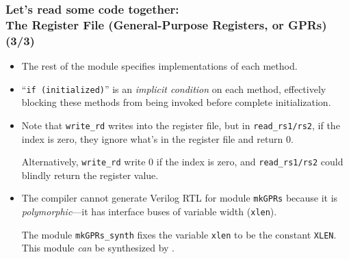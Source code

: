 \begin{frame}[fragile]
\frametitle{Let's read some code together: \\
            The Register File (General-Purpose Registers, or GPRs) (3/3)}

\begin{center}\scriptsize


 \vspace{1ex}

 \begin{minipage}{0.8\textwidth}
  \begin{itemize}

   \item The rest of the module specifies implementations of each method.

   \vspace*{1ex}

   \item ``{\tt if (initialized)}'' is an \emph{implicit condition} on
       each method, effectively blocking these methods from being
       invoked before complete initialization.

   \item Note that {\tt write\_rd} writes into the register file, but
       in {\tt read\_rs1/rs2}, if the index is zero, they ignore
       what's in the register file and return 0.

       \vspace*{1ex}

       Alternatively, {\tt write\_rd} write 0 if the index is zero,
       and {\tt read\_rs1/rs2} could blindly return the register
       value.

   \vspace*{2ex}

   \item The {\bsc} compiler cannot generate Verilog RTL for module
     {\tt mkGPRs} because it is \emph{polymorphic}---it has interface
     buses of variable width ({\tt xlen}).

     \vspace*{1ex}

     The module {\tt mkGPRs\_synth} fixes the variable {\tt xlen} to
     be the constant {\tt XLEN}.  This module \emph{can} be synthesized
     by {\bsc}.

  \end{itemize}

 \end{minipage}
\end{center}

\end{frame}

